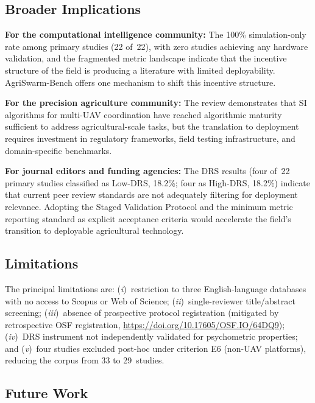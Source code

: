 \documentclass[review,3p]{elsarticle}
\begin{document}
\subsection{Broader Implications}

\textbf{For the computational intelligence community:} The 100\% simulation-only
rate among primary studies (22 of~22), with zero studies achieving any hardware
validation, and the fragmented metric landscape indicate that the incentive
structure of the field is producing a literature with limited deployability.
AgriSwarm-Bench offers one mechanism to shift this incentive structure.

\textbf{For the precision agriculture community:} The review demonstrates that
SI algorithms for multi-UAV coordination have reached algorithmic maturity
sufficient to address agricultural-scale tasks, but the translation to
deployment requires investment in regulatory frameworks, field testing
infrastructure, and domain-specific benchmarks.

\textbf{For journal editors and funding agencies:} The DRS results (four of~22
primary studies classified as Low-DRS, 18.2\%; four as High-DRS, 18.2\%)
indicate that current peer review standards are not adequately filtering for
deployment relevance. Adopting the Staged Validation Protocol and the minimum
metric reporting standard as explicit acceptance criteria would accelerate the
field's transition to deployable agricultural technology.

\subsection{Limitations}
\label{sec:limitations}

The principal limitations are: (\textit{i})~restriction to three
English-language databases with no access to Scopus or Web of Science;
(\textit{ii})~single-reviewer title/abstract screening; (\textit{iii})~absence
of prospective protocol registration (mitigated by retrospective OSF
registration, \url{https://doi.org/10.17605/OSF.IO/64DQ9}); (\textit{iv})~DRS
instrument not independently validated for psychometric properties; and
(\textit{v})~four studies excluded post-hoc under criterion E6 (non-UAV
platforms), reducing the corpus from 33 to 29~studies.

\subsection{Future Work}
\label{subsec:future_work}
\end{document}
